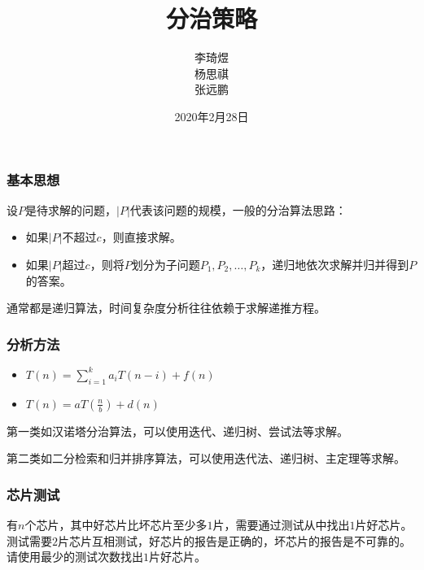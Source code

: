 \documentclass{ctexbeamer}
\title{分治策略}
\author{李琦煜 \\ 杨思祺 \\ 张远鹏}
\institute{算法设计与分析2020小班17}
\date{2020年2月28日}
\begin{document}
    \begin{frame}
        \maketitle
    \end{frame}

    \begin{frame}
        \frametitle{基本思想}

        设$P$是待求解的问题，$|P|$代表该问题的规模，一般的分治算法思路：

        \begin{itemize}
            \item 如果$|P|$不超过$c$，则直接求解。
            \item 如果$|P|$超过$c$，则将$P$划分为子问题$P_1,P_2,\ldots,P_k$，递归地依次求解并归并得到$P$的答案。
        \end{itemize}

        通常都是递归算法，时间复杂度分析往往依赖于求解递推方程。

    \end{frame}

    \begin{frame}
        \frametitle{分析方法}

        \begin{itemize}
            \item $T(n) = \sum_{i=1}^{k}{a_i T(n-i)} + f(n)$
            \item $T(n) = a T(\frac{n}{b}) + d(n)$
        \end{itemize}

        第一类如汉诺塔分治算法，可以使用迭代、递归树、尝试法等求解。

        第二类如二分检索和归并排序算法，可以使用迭代法、递归树、主定理等求解。

    \end{frame}

    \begin{frame}
        \frametitle{芯片测试}

        有$n$个芯片，其中好芯片比坏芯片至少多$1$片，需要通过测试从中找出$1$片好芯片。测试需要$2$片芯片互相测试，好芯片的报告是正确的，坏芯片的报告是不可靠的。请使用最少的测试次数找出$1$片好芯片。

    \end{frame}
\end{document}
